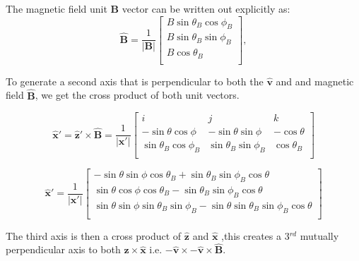 \documentclass[11pt]{article}
\begin{document}
The magnetic field unit $\mathbf{{B}}$ vector can be written out explicitly as:
\begin{equation}
   \mathbf{\hat{B}}=\frac{1}{\mathbf{|{B}|}} \left[
    \begin{array}{c}
    B\sin\theta_B \cos\phi_B \\ 	
    B\sin\theta_B \sin\phi_B \\ 
    B\cos\theta_B\\
\end{array} 
\right],  %
\end{equation}

To generate a second axis that is perpendicular to both the $\mathbf{\hat{v}}$ and and magnetic field  $\mathbf{\hat{B}}$, we get the cross product of both unit vectors.

\begin{equation}
    \mathbf{\hat{x}'} =\mathbf{\hat{z}'}\times \mathbf{\hat{B}} = \frac{1}{\mathbf{|{x'}|}}\left[
    \begin{array}{ccc}
    i & j & k \\ 	
   - \sin\theta \cos\phi & -\sin\theta \sin\phi  & -\cos\theta \\ 
     \sin\theta_B\cos\phi_B& \sin\theta_B\sin\phi_B  & \cos\theta_B\\
\end{array} 
\right]
\end{equation}

\begin{equation}
   \mathbf{\hat{x}'}=\frac{1}{\mathbf{|{x'}|}}\left[
    \begin{array}{c}
   -\sin\theta\sin\phi\cos\theta_B + \sin\theta_B\sin\phi_B\cos\theta\\ 	
    \sin\theta\cos\phi\cos\theta_B - \sin\theta_B\sin\phi_B\cos\theta\\ 

    \sin\theta\sin\phi\sin\theta_B\sin\phi_B - \sin\theta\sin\theta_B\sin\phi_B\cos\theta\\
\end{array} 
\right]
\end{equation}

The third axis is then a cross product of   $\mathbf{\hat{z}}$ and $\mathbf{\hat{x}}$ ,this creates a 3$^{rd}$ mutually perpendicular axis to both $\mathbf{\hat{z}} \times \mathbf{\hat{x}} $  i.e. $\mathbf{-\hat{v}} \times\mathbf{-\hat{v}}\times \mathbf{\hat{B}}$. 
\end{document}
